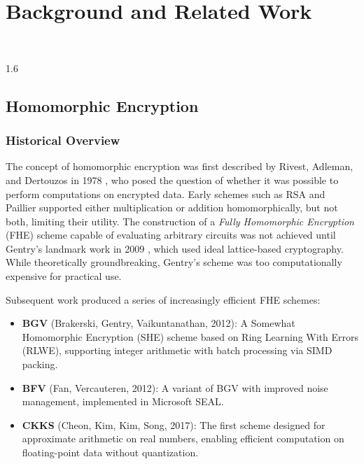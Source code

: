 \chapter{Background and Related Work}
\HRule\\[2cm]
\label{Chapter2}

\begin{spacing}{1.6}

\section{Homomorphic Encryption}

\subsection{Historical Overview}

The concept of homomorphic encryption was first described by Rivest, Adleman,
and Dertouzos in 1978 \cite{rivest1978}, who posed the question of whether it
was possible to perform computations on encrypted data. Early schemes such as
RSA and Paillier supported either multiplication or addition homomorphically,
but not both, limiting their utility. The construction of a
\textit{Fully Homomorphic Encryption} (FHE) scheme capable of evaluating
arbitrary circuits was not achieved until Gentry's landmark work in 2009
\cite{gentry2009}, which used ideal lattice-based cryptography. While
theoretically groundbreaking, Gentry's scheme was too computationally expensive
for practical use.

Subsequent work produced a series of increasingly efficient FHE schemes:

\begin{itemize}
  \item \textbf{BGV} (Brakerski, Gentry, Vaikuntanathan, 2012): A Somewhat
  Homomorphic Encryption (SHE) scheme based on Ring Learning With Errors
  (RLWE), supporting integer arithmetic with batch processing via SIMD packing.
  \item \textbf{BFV} (Fan, Vercauteren, 2012): A variant of BGV with improved
  noise management, implemented in Microsoft SEAL.
  \item \textbf{CKKS} (Cheon, Kim, Kim, Song, 2017): The first scheme designed
  for approximate arithmetic on real numbers, enabling efficient computation on
  floating-point data without quantization.
\end{itemize}


\end{spacing}
